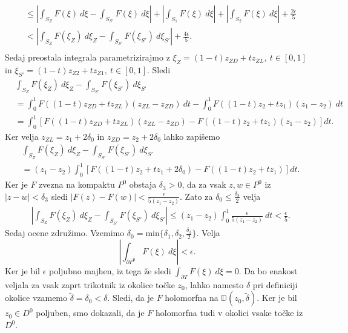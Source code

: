 \documentclass[mat1, tisk]{fmfdelo}
\begin{document}
\begin{dokaz}
\begin{align*}
            & \leq \left|\int_{S_Z}{F(\xi)~d\xi} - \int_{S_{S'}}{F(\xi)~d\xi}\right| + \left|\int_{S_1}{F(\xi)~d\xi}\right| + \left|\int_{S_2}{F(\xi)~d\xi}\right| + \frac{2\epsilon}{5}\\
            & < \left|\int_{S_Z}{F(\xi_Z)~d\xi_Z} - \int_{S_{S'}}{F(\xi_{S'})~d\xi_{S'}}\right| + \frac{4\epsilon}{5}.\\
        \end{align*}
        Sedaj preostala integrala parametrizirajmo z $\xi_Z = (1 -t)z_{ZD} + t z_{ZL},~t \in [0,1]$ in $\xi_{S'} = (1 -t)z_{Z2} + t z_{Z1},~t \in [0,1]$.
        Sledi
        \begin{align*}
            &\int_{S_Z}{F(\xi_Z)~d\xi_Z} - \int_{S_{S'}}{F(\xi_{S'})~d\xi_{S'}}\\
            &=\int_{0}^{1}{F((1 -t)z_{ZD} + t z_{ZL})(z_{ZL} - z_{ZD})~dt} - \int_{0}^{1}{F((1 -t)z_{2} + t z_{1})(z_{1} - z_{2})~dt}\\
            &=\int_{0}^{1}{\left[F((1 -t)z_{ZD} + t z_{ZL})(z_{ZL} - z_{ZD}) - F((1 -t)z_{2} + t z_{1})(z_{1} - z_{2})\right]dt}.
        \end{align*}  
        Ker velja $z_{ZL} = z_{1} + 2 \delta_0$ in $z_{ZD} = z_2 + 2 \delta_0$ lahko zapišemo
        \begin{align*}
            &\int_{S_Z}{F(\xi_Z)~d\xi_Z} - \int_{S_{S'}}{F(\xi_{S'})~d\xi_{S'}}\\
            &=(z_{1} - z_{2})\int_{0}^{1}{\left[F((1 -t)z_{2} + t z_{1} + 2 \delta_0) - F((1 -t)z_{2} + t z_{1})\right]dt}.
        \end{align*}  
        Ker je $F$ zvezna na kompaktu $P^0$ obstaja $\delta_3 >0$, da za vsak $z, w \in P^0$ iz $|z -w| < \delta_3$ sledi $|F(z) - F(w)| < \frac{\epsilon}{5(z_1 - z_2)}$.
        Zato za $\delta_0 \leq \frac{\delta_3}{2}$ velja
        \begin{align*}
            &\left|\int_{S_Z}{F(\xi_Z)~d\xi_Z} - \int_{S_{S'}}{F(\xi_{S'})~d\xi_{S'}}\right|
            \leq (z_{1} - z_{2})\int_{0}^{1}{\frac{\epsilon}{5(z_{1} - z_{2})}~dt} < \frac{\epsilon}{5}.
        \end{align*}  
        Sedaj ocene združimo. Vzemimo $\delta_0 = \text{min}\{\delta_1, \delta_2, \frac{\delta_3}{2}\}$. Velja
        $$ 
        \left|\int_{\partial P^0}{F(\xi)~d\xi}\right|< \epsilon.
        $$
        Ker je bil $\epsilon$ poljubno majhen, iz tega že sledi $\int_{\partial T}{F(\xi)~d\xi} = 0$. 
        Da bo enakost veljala za vsak zaprt trikotnik iz okolice točke $z_0$, lahko namesto $\delta$ pri definiciji okolice vzamemo $\widetilde{\delta} = \delta_0 < \delta$. 
        Sledi, da je $F$ holomorfna na $\mathbb{D}(z_0, \widetilde{\delta})$. Ker je bil $z_0 \in D^0$ poljuben, smo dokazali, da je $F$ holomorfna tudi v okolici vsake točke iz $D^0$. 
    \end{dokaz}
\end{document}
